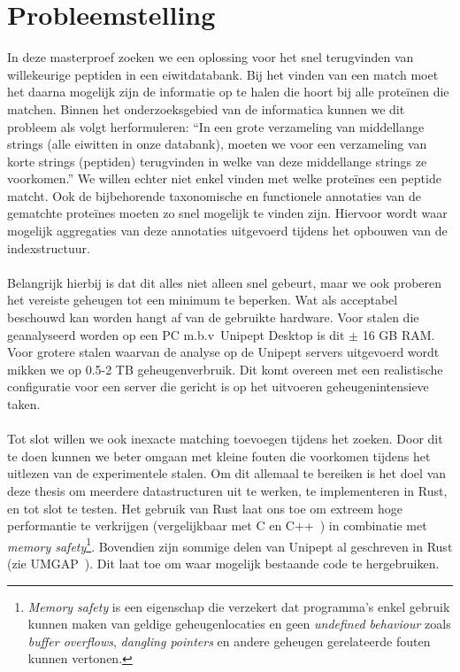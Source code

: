 \section{Probleemstelling}\label{sec:probleemstelling}
In deze masterproef zoeken we een oplossing voor het snel terugvinden van willekeurige peptiden in een eiwitdatabank.
Bij het vinden van een match moet het daarna mogelijk zijn de informatie op te halen die hoort bij alle proteïnen die matchen.
Binnen het onderzoeksgebied van de informatica kunnen we dit probleem als volgt herformuleren:
``In een grote verzameling van middellange strings (alle eiwitten in onze databank), moeten we voor een verzameling van korte strings (peptiden) terugvinden in welke van deze middellange strings ze voorkomen.''
We willen echter niet enkel vinden met welke proteïnes een peptide matcht.
Ook de bijbehorende taxonomische en functionele annotaties van de gematchte proteïnes moeten zo snel mogelijk te vinden zijn.
Hiervoor wordt waar mogelijk aggregaties van deze annotaties uitgevoerd tijdens het opbouwen van de indexstructuur.
\\ \\
Belangrijk hierbij is dat dit alles niet alleen snel gebeurt, maar we ook proberen het vereiste geheugen tot een minimum te beperken.
Wat als acceptabel beschouwd kan worden hangt af van de gebruikte hardware.
Voor stalen die geanalyseerd worden op een PC m.b.v~Unipept Desktop is dit $\pm$ 16 GB RAM\@.
Voor grotere stalen waarvan de analyse op de Unipept servers uitgevoerd wordt mikken we op 0.5-2 TB geheugenverbruik.
Dit komt overeen met een realistische configuratie voor een server die gericht is op het uitvoeren geheugenintensieve taken.
\\ \\
Tot slot willen we ook inexacte matching toevoegen tijdens het zoeken.
Door dit te doen kunnen we beter omgaan met kleine fouten die voorkomen tijdens het uitlezen van de experimentele stalen.
Om dit allemaal te bereiken is het doel van deze thesis om meerdere datastructuren uit te werken, te implementeren in Rust, en tot slot te testen.
Het gebruik van Rust laat ons toe om extreem hoge performantie te verkrijgen (vergelijkbaar met C en C++~\cite{rustPerformantie}) in combinatie met \textit{memory safety}\footnote{\textit{Memory safety} is een eigenschap die verzekert dat programma's enkel gebruik kunnen maken van geldige geheugenlocaties en geen \textit{undefined behaviour} zoals \textit{buffer overflows}, \textit{dangling pointers} en andere geheugen gerelateerde fouten kunnen vertonen.}.
Bovendien zijn sommige delen van Unipept al geschreven in Rust (zie UMGAP~\cite{UMGAP_paper, UMGAP_source}).
Dit laat toe om waar mogelijk bestaande code te hergebruiken.


